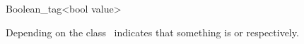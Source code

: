 \begin{ccRefClass}{Boolean_tag<bool value>}

\ccDefinition

Depending on  the class \ccRefName\ indicates that 
something is  or  respectively. 

\ccConstants
 


\ccSeeAlso
{} \\

\end{ccRefClass}
